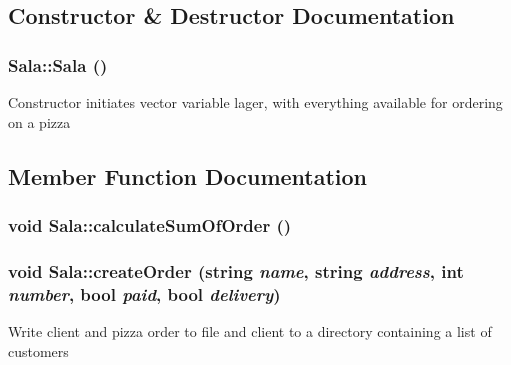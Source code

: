 \subsection{Constructor \& Destructor Documentation}
\hypertarget{class_sala_da283dd136f3f0c2703d0356f49c1e6e}{
\subsubsection[Sala]{\setlength{\rightskip}{0pt plus 5cm}Sala::Sala ()}}
\label{class_sala_da283dd136f3f0c2703d0356f49c1e6e}


Constructor initiates vector variable lager, with everything available for ordering on a pizza 

\subsection{Member Function Documentation}
\hypertarget{class_sala_24b9bb5302a251b41fed3df1fb7ce8ad}{
\subsubsection[calculateSumOfOrder]{\setlength{\rightskip}{0pt plus 5cm}void Sala::calculate\-Sum\-Of\-Order ()}}
\label{class_sala_24b9bb5302a251b41fed3df1fb7ce8ad}


\hypertarget{class_sala_9f3c48158017cdc015a985e9712f0179}{
\subsubsection[createOrder]{\setlength{\rightskip}{0pt plus 5cm}void Sala::create\-Order (string {\em name}, string {\em address}, int {\em number}, bool {\em paid}, bool {\em delivery})}}
\label{class_sala_9f3c48158017cdc015a985e9712f0179}


Write client and pizza order to file and client to a directory containing a list of customers

